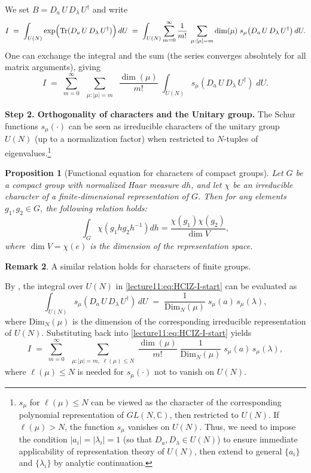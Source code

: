 \documentclass[letterpaper,11pt,oneside,reqno]{book}
\numberwithin{equation}{chapter}  %
\newtheorem{proposition}{Proposition}[chapter]  %
\theoremstyle{definition}
\newtheorem{remark}[proposition]{Remark}
\begin{document}
We set \(B = D_a\,U\,D_\lambda\,U^\dagger\) and write
\[
I \;=\;
\int_{U(N)}
\exp\Bigl(\mathrm{Tr}(D_a\,U\,D_\lambda\,U^\dagger)\Bigr)\,dU
\;=\;
\int_{U(N)}
\sum_{m=0}^\infty
\frac{1}{m!}
\;\sum_{\substack{\mu:|\mu|=m}}
\dim(\mu)\;
s_\mu\bigl(D_a\,U\,D_\lambda\,U^\dagger\bigr)\,dU.
\]
One can exchange the integral and the sum (the series converges absolutely for all matrix arguments), giving
\begin{equation}
	\label{lecture11:eq:HCIZ-I-start}
	I
	\;=\;
	\sum_{m=0}^\infty\;
	\sum_{\substack{\mu:|\mu|=m}}\;
	\frac{\dim(\mu)}{m!}
	\;\int_{U(N)} s_\mu(D_a\,U\,D_\lambda\,U^\dagger)\;dU.
\end{equation}

\smallskip

\noindent
\textbf{Step 2. Orthogonality of characters and the Unitary group.}
The Schur functions \(s_\mu(\cdot)\) can be seen as irreducible characters of the unitary group \(U(N)\) (up to a normalization factor) when restricted to \(N\)-tuples of eigenvalues.\footnote{$s_\mu$ for $\ell(\mu)\le N$ can be viewed as the character of the corresponding polynomial representation of $GL(N,\mathbb{C})$, then restricted to $U(N)$.  If $\ell(\mu) > N$, the function $s_\mu$ vanishes on $U(N)$. Thus,
we need to impose the condition \(|a_i|=|\lambda_i|=1\) (so that \(D_a,D_\lambda\in U(N)\)) to ensure immediate applicability of representation theory of $U(N)$, then extend to general \(\{a_i\}\) and \(\{\lambda_i\}\) by analytic continuation.}

\begin{proposition}[Functional equation for characters
	of compact groups]
	\label{lecture11:prop:character-functional}
Let $G$ be a compact group with normalized Haar measure $dh$, and let $\chi$ be an irreducible character of a finite-dimensional representation of $G$. Then for any elements $g_1, g_2 \in G$, the following relation holds:
\begin{equation}
	\int_G \chi(g_1hg_2h^{-1})dh = \frac{\chi(g_1)\chi(g_2)}{\dim V},
\end{equation}
where $\dim V = \chi(e)$ is the dimension of the representation space.
\end{proposition}
\begin{remark}
	A similar relation holds for characters of finite groups.
\end{remark}
By , the integral over $U(N)$ in \eqref{lecture11:eq:HCIZ-I-start} can be evaluated as
\[
\int_{U(N)} s_\mu(D_a\,U\,D_\lambda\,U^\dagger)\,dU
\;=\;
\frac{1}{\mathrm{Dim}_N(\mu)}
\;s_\mu(a)\,s_\mu(\lambda),
\]
where
\(\mathrm{Dim}_N(\mu)\) is the dimension of the corresponding irreducible representation of $U(N)$.  Substituting back into \eqref{lecture11:eq:HCIZ-I-start} yields
\[
I \;=\;
\sum_{m=0}^\infty\;
\sum_{\substack{\mu:|\mu|=m,\;\ell(\mu)\le N}}
\frac{\dim(\mu)}{m!}
\;\frac{1}{\mathrm{Dim}_N(\mu)}
\;s_\mu(a)\,s_\mu(\lambda),
\]
where \(\ell(\mu)\le N\) is needed for $s_\mu(\cdot)$ not to vanish on $U(N)$.
\end{document}
